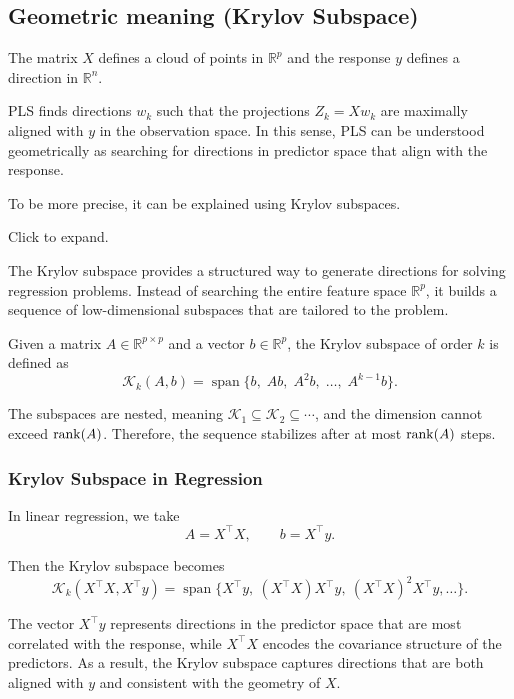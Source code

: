 \documentclass[
  letterpaper,
  DIV=11,
  numbers=noendperiod]{scrreprt}
\theoremstyle{definition}
\theoremstyle{definition}
\theoremstyle{plain}
\theoremstyle{plain}
\theoremstyle{remark}
\begin{document}
\subsection{Geometric meaning (Krylov
Subspace)}\label{geometric-meaning-krylov-subspace}

The matrix \(X\) defines a cloud of points in \(\mathbb{R}^p\) and the
response \(y\) defines a direction in \(\mathbb{R}^n\).

PLS finds directions \(w_k\) such that the projections \(Z_k = X w_k\)
are maximally aligned with \(y\) in the observation space. In this
sense, PLS can be understood geometrically as searching for directions
in predictor space that align with the response.

To be more precise, it can be explained using Krylov subspaces.

Click to expand.

The Krylov subspace provides a structured way to generate directions for
solving regression problems. Instead of searching the entire feature
space \(\mathbb{R}^p\), it builds a sequence of low-dimensional
subspaces that are tailored to the problem.

Given a matrix \(A \in \mathbb{R}^{p \times p}\) and a vector
\(b \in \mathbb{R}^p\), the Krylov subspace of order \(k\) is defined as
\[
\mathcal{K}_k(A, b)
=
\operatorname{span}\{b,\; Ab,\; A^2 b,\; \dots,\; A^{k-1} b\}.
\]

The subspaces are nested, meaning
\(\mathcal{K}_1 \subseteq \mathcal{K}_2 \subseteq \cdots\), and the
dimension cannot exceed \(\rank(A)\). Therefore, the sequence stabilizes
after at most \(\rank(A)\) steps.

\subsubsection{Krylov Subspace in
Regression}\label{krylov-subspace-in-regression}

In linear regression, we take \[
A = X^\top X, \qquad b = X^\top y.
\]

Then the Krylov subspace becomes \[
\mathcal{K}_k(X^\top X, X^\top y)
=
\operatorname{span}\{X^\top y,\ (X^\top X)X^\top y,\ (X^\top X)^2 X^\top y,\dots\}.
\]

The vector \(X^\top y\) represents directions in the predictor space
that are most correlated with the response, while \(X^\top X\) encodes
the covariance structure of the predictors. As a result, the Krylov
subspace captures directions that are both aligned with \(y\) and
consistent with the geometry of \(X\).
\end{document}
